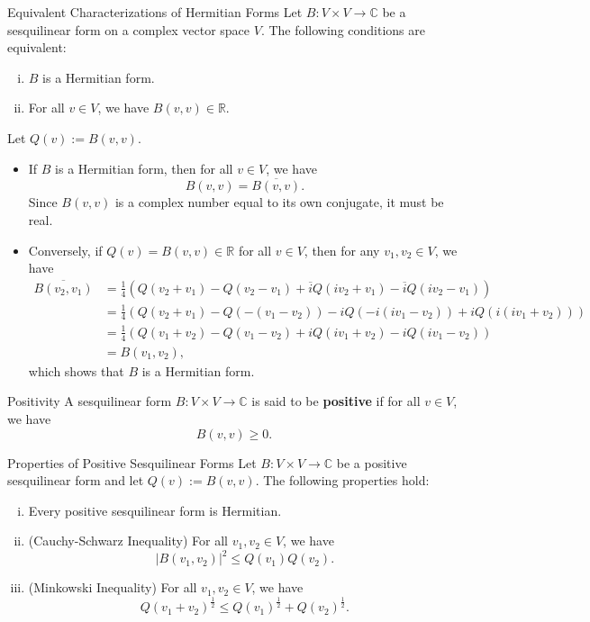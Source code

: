 \begin{proposition}{Equivalent Characterizations of Hermitian Forms}{}
    Let $B: V\times V\to \mathbb{C}$ be a sesquilinear form on a complex vector space $V$. The following conditions are equivalent:
    \begin{enumerate}[(i)]
        \item $B$ is a Hermitian form.
        \item For all $v\in V$, we have $B(v, v) \in \mathbb{R}$.
    \end{enumerate}
\end{proposition}
\begin{prf}
    Let $Q(v) := B(v, v)$.
    \begin{itemize}
        \item If $B$ is a Hermitian form, then for all $v\in V$, we have
        \[
            B(v, v) = \overline{B(v, v)}.
        \]
        Since $B(v, v)$ is a complex number equal to its own conjugate, it must be real.

        \item Conversely, if $Q(v)=B(v, v) \in \mathbb{R}$ for all $v\in V$, then for any $v_1, v_2\in V$, we have
        \[
            \begin{aligned}
                \overline{B(v_2, v_1)}&=  \frac{1}{4} \left(Q(v_2+v_1) - Q(v_2-v_1) + \overline{i}Q(iv_2+v_1) - \overline{i}Q(iv_2-v_1)\right)\\
                &=  \frac{1}{4} \left(Q(v_2+v_1) - Q(-(v_1-v_2)) - iQ(-i(iv_1-v_2)) + iQ(i(iv_1+v_2))\right)\\
                &= \frac{1}{4} \left(Q(v_1+v_2) - Q(v_1-v_2) + iQ(iv_1+v_2) - iQ(iv_1-v_2)\right)\\
                &= B(v_1, v_2),
            \end{aligned}
        \]
        which shows that $B$ is a Hermitian form.
    \end{itemize}
\end{prf}

\begin{definition}{Positivity}{}
    A sesquilinear form $B: V\times V\to \mathbb{C}$ is said to be \textbf{positive} if for all $v\in V$, we have
    \[
        B(v, v) \ge 0.
    \]
\end{definition}

\begin{proposition}{Properties of Positive Sesquilinear Forms}{}
    Let $B: V\times V\to \mathbb{C}$ be a positive sesquilinear form and let $Q(v) := B(v, v)$. The following properties hold:
    \begin{enumerate}[(i)]
        \item Every positive sesquilinear form is Hermitian.
        \item (Cauchy-Schwarz Inequality) For all $v_1, v_2\in V$, we have
        \[
            |B(v_1, v_2)|^2 \le Q(v_1) Q(v_2).
        \]
        \item (Minkowski Inequality) For all $v_1, v_2\in V$, we have
        \[
            Q(v_1+v_2)^{\frac12} \le Q(v_1)^{\frac12}+ Q(v_2)^{\frac12}.
        \]
    \end{enumerate}
\end{proposition}


